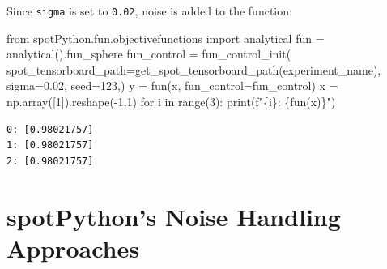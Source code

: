 \documentclass[
  letterpaper,
  DIV=11,
  numbers=noendperiod]{scrreprt}
\newenvironment{Shaded}{\begin{snugshade}}{\end{snugshade}}
\newcommand{\BuiltInTok}[1]{\textcolor[rgb]{0.00,0.23,0.31}{#1}}
\newcommand{\ControlFlowTok}[1]{\textcolor[rgb]{0.00,0.23,0.31}{#1}}
\newcommand{\DecValTok}[1]{\textcolor[rgb]{0.68,0.00,0.00}{#1}}
\newcommand{\FloatTok}[1]{\textcolor[rgb]{0.68,0.00,0.00}{#1}}
\newcommand{\ImportTok}[1]{\textcolor[rgb]{0.00,0.46,0.62}{#1}}
\newcommand{\KeywordTok}[1]{\textcolor[rgb]{0.00,0.23,0.31}{#1}}
\newcommand{\NormalTok}[1]{\textcolor[rgb]{0.00,0.23,0.31}{#1}}
\newcommand{\OperatorTok}[1]{\textcolor[rgb]{0.37,0.37,0.37}{#1}}
\newcommand{\SpecialCharTok}[1]{\textcolor[rgb]{0.37,0.37,0.37}{#1}}
\newcommand{\SpecialStringTok}[1]{\textcolor[rgb]{0.13,0.47,0.30}{#1}}
\begin{document}
\begin{tcolorbox}[enhanced jigsaw, arc=.35mm, colback=white, bottomtitle=1mm, toprule=.15mm, coltitle=black, titlerule=0mm, leftrule=.75mm, title=\textcolor{quarto-callout-note-color}{\faInfo}\hspace{0.5em}{Example: The same noise added to the sphere function}, opacitybacktitle=0.6, breakable, colbacktitle=quarto-callout-note-color!10!white, opacityback=0, toptitle=1mm, rightrule=.15mm, left=2mm, colframe=quarto-callout-note-color-frame, bottomrule=.15mm]

Since \texttt{sigma} is set to \texttt{0.02}, noise is added to the
function:

\begin{Shaded}
\begin{Highlighting}[]
\ImportTok{from}\NormalTok{ spotPython.fun.objectivefunctions }\ImportTok{import}\NormalTok{ analytical}
\NormalTok{fun }\OperatorTok{=}\NormalTok{ analytical().fun\_sphere}
\NormalTok{fun\_control }\OperatorTok{=}\NormalTok{ fun\_control\_init(}
\NormalTok{    spot\_tensorboard\_path}\OperatorTok{=}\NormalTok{get\_spot\_tensorboard\_path(experiment\_name),}
\NormalTok{    sigma}\OperatorTok{=}\FloatTok{0.02}\NormalTok{,}
\NormalTok{    seed}\OperatorTok{=}\DecValTok{123}\NormalTok{,)}
\NormalTok{y }\OperatorTok{=}\NormalTok{ fun(x, fun\_control}\OperatorTok{=}\NormalTok{fun\_control)}
\NormalTok{x }\OperatorTok{=}\NormalTok{ np.array([}\DecValTok{1}\NormalTok{]).reshape(}\OperatorTok{{-}}\DecValTok{1}\NormalTok{,}\DecValTok{1}\NormalTok{)}
\ControlFlowTok{for}\NormalTok{ i }\KeywordTok{in} \BuiltInTok{range}\NormalTok{(}\DecValTok{3}\NormalTok{):}
    \BuiltInTok{print}\NormalTok{(}\SpecialStringTok{f"}\SpecialCharTok{\{}\NormalTok{i}\SpecialCharTok{\}}\SpecialStringTok{: }\SpecialCharTok{\{}\NormalTok{fun(x)}\SpecialCharTok{\}}\SpecialStringTok{"}\NormalTok{)}
\end{Highlighting}
\end{Shaded}

\begin{verbatim}
0: [0.98021757]
1: [0.98021757]
2: [0.98021757]
\end{verbatim}

\end{tcolorbox}

\hypertarget{spotpythons-noise-handling-approaches}{%
\section{spotPython's Noise Handling
Approaches}\label{spotpythons-noise-handling-approaches}}
\end{document}
